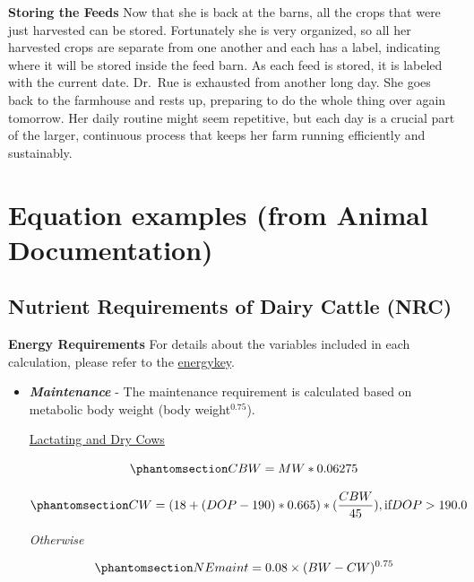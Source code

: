 \documentclass[
  letterpaper,
  DIV=11,
  numbers=noendperiod]{scrreprt}
\begin{document}
\textbf{Storing the Feeds} Now that she is back at the barns, all the
crops that were just harvested can be stored. Fortunately she is very
organized, so all her harvested crops are separate from one another and
each has a label, indicating where it will be stored inside the feed
barn. As each feed is stored, it is labeled with the current date.
Dr.~Rue is exhausted from another long day. She goes back to the
farmhouse and rests up, preparing to do the whole thing over again
tomorrow. Her daily routine might seem repetitive, but each day is a
crucial part of the larger, continuous process that keeps her farm
running efficiently and sustainably.


\chapter{Equation examples (from Animal
Documentation)}\label{equation-examples-from-animal-documentation}

\section{Nutrient Requirements of Dairy Cattle (NRC)}\label{sec-nrc}

\textbf{Energy Requirements} For details about the variables included in
each calculation, please refer to the
\href{energy\%20requirements\%20key}{energykey}.

\begin{itemize}
\item
  \textbf{\emph{Maintenance}} - The maintenance requirement is
  calculated based on metabolic body weight (body weight\(^{0.75}\)).

  \ul{Lactating and Dry Cows}

  \begin{equation}\protect\phantomsection\label{eq-nrc-cbw}{CBW = MW * 0.06275}\end{equation}

  \begin{equation}\protect\phantomsection\label{eq-nrc-cw}{ CW = {(18 + (DOP - 190) * 0.665) * (\frac{CBW}{45}),\text{if}DOP > 190.0} }\end{equation}

  \emph{Otherwise}

  \begin{equation}\protect\phantomsection\label{eq-nrc-ne-maint}{ NEmaint = 0.08 \times (BW - CW)^{0.75} }\end{equation}
\end{itemize}
\end{document}
